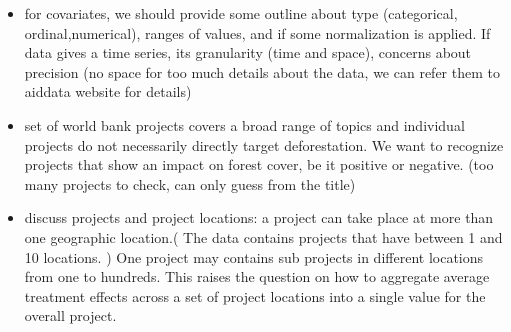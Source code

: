 \begin{itemize}
\item for covariates, we should provide some outline about type (categorical, ordinal,numerical), ranges of values, and if some normalization is applied. If data gives a time series, its granularity (time and space), concerns about precision
(no space for too much details about the data, we can refer them to aiddata website for details)
\item set of world bank projects covers a broad range of topics and individual projects do not necessarily directly target deforestation. We want to recognize projects that show an impact on forest cover, be it positive or negative. (too many projects to check, can only guess from the title)
\item discuss projects and project locations: a project can take place at more than one geographic location.( The data contains projects that have between 1 and 10 locations. )  One project may contains sub projects in different locations from one to hundreds.  This raises the question on how to aggregate average treatment effects across a set of project locations into a single value for the overall project.
\end{itemize}


